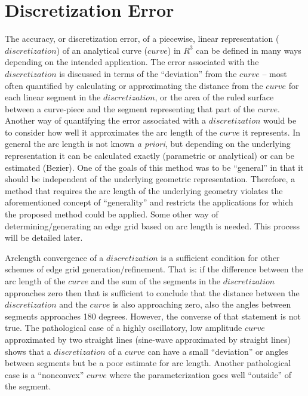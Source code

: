 \section{Discretization Error}
The accuracy, or discretization error, of a piecewise, linear 
representation ($discretization$) of an analytical curve ($curve$) in 
$R^3$ can be defined in many ways depending on the intended application.  
The error associated with the $discretization$ is discussed in terms of 
the ``deviation'' from the $curve$ -- most often quantified by calculating 
or approximating the distance from the $curve$ for each linear segment in 
the $discretization$, or the area of the ruled surface between a 
curve-piece and the segment representing that part of the $curve$.  
Another way of quantifying the error associated with a $discretization$ 
would be to consider how well it approximates the arc length of the 
$curve$ it represents.  In general the arc length is not known {\it{a 
priori}}, 
but depending on the underlying representation it can be calculated 
exactly (parametric or analytical) or can be estimated (Bezier).  One of 
the goals of this method was to be ``general'' in that it should be 
independent of the underlying geometric representation.  Therefore, a 
method that requires the arc length of the underlying geometry violates 
the 
aforementioned concept of ``generality'' and restricts the applications 
for which the proposed method could be applied.  Some other way of 
determining/generating an edge grid based on arc length is needed.  This 
process will be detailed later.

Arclength convergence of a $discretization$ is a sufficient condition for 
other schemes of edge grid generation/refinement.  That is: if the 
difference between the arc length of the $curve$ and the sum of the 
segments in the $discretization$ approaches zero then that is sufficient 
to conclude that the distance between the $discretization$ and the $curve$ 
is also approaching zero, also the angles between segments approaches 180 
degrees.  However, the converse of that statement is not true.  The 
pathological case of a highly oscillatory, low amplitude $curve$ 
approximated by two straight lines (sine-wave approximated by straight 
lines) shows that a $discretization$ of a $curve$ can have a small 
``deviation'' or angles between segments but be a poor estimate for arc 
length.  Another pathological case is a ``nonconvex'' $curve$ where the 
parameterization goes well ``outside'' of the segment.
